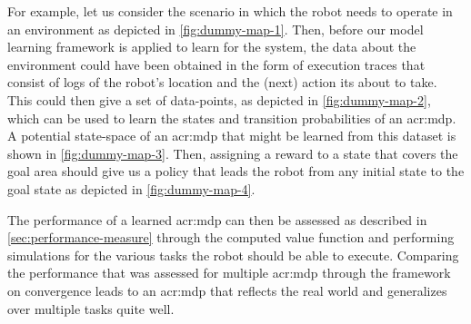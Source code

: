 For example, let us consider the scenario in which the robot needs to operate in an environment as depicted in \autoref{fig:dummy-map-1}.
Then, before our model learning framework is applied to learn  for the system, the data about the environment could have been obtained in the form of execution traces that consist of logs of the robot's location and the (next) action its about to take.
This could then give a set of data-points, as depicted in \autoref{fig:dummy-map-2}, which can be used to learn the states and transition probabilities of an \acrshort{acr:mdp}.
A potential state-space of an \acrshort{acr:mdp} that might be learned from this dataset is shown in \autoref{fig:dummy-map-3}.
Then, assigning a reward to a state that covers the goal area should give us a policy that leads the robot from any initial state to the goal state as depicted in \autoref{fig:dummy-map-4}.

The performance of a learned \acrshort{acr:mdp} can then be assessed as described in \autoref{sec:performance-measure} through the computed value function and performing simulations for the various tasks the robot should be able to execute.
Comparing the performance that was assessed for multiple \acrshort{acr:mdp} through the framework on convergence leads to an \acrshort{acr:mdp} that reflects the real world and generalizes over multiple tasks quite well.





